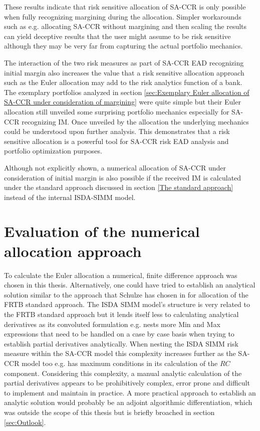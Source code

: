 \documentclass[../Thesis_AHoecherl.tex]{subfiles}
\begin{document}
    These results indicate that risk sensitive allocation of SA-CCR is only possible when fully recognizing margining during the allocation. Simpler workarounds such as e.g. allocating SA-CCR without margining and then scaling the results can yield deceptive results that the user might assume to be risk sensitive although they may be very far from capturing the actual portfolio mechanics.
    
    The interaction of the two risk measures as part of SA-CCR EAD recognizing initial margin also increases the value that a risk sensitive allocation approach such as the Euler allocation may add to the risk analytics function of a bank.
    The exemplary portfolios analyzed in section \ref{sec:Exemplary Euler allocation of SA-CCR under consideration of margining} were quite simple but their Euler allocation still unveiled some surprising portfolio mechanics especially for SA-CCR recognizing IM.
    Once unveiled by the allocation the underlying mechanics could be understood upon further analysis. This demonstrates that a risk sensitive allocation is a powerful tool for SA-CCR risk EAD analysis and portfolio optimization purposes.

    Although not explicitly shown, a numerical allocation of SA-CCR under consideration of initial margin is also possible if the received IM is calculated under the standard approach discussed in section \ref{The standard approach} instead of the internal ISDA-SIMM model. 

    \section{Evaluation of the numerical allocation approach\label{Evaluation of the numerical allocation approach}}

    To calculate the Euler allocation a numerical, finite difference approach was chosen in this thesis. Alternatively, one could have tried to establish an analytical solution similar to the approach that Schulze has chosen in \cite{schulze2018capital} for allocation of the FRTB standard approach.
    The ISDA SIMM model's structure is very related to the FRTB standard approach but it lends itself less to calculating analytical derivatives as its convoluted formulation e.g. nests more Min and Max expressions that need to be handled on a case by case basis when trying to establish partial derivatives analytically.
    When nesting the ISDA SIMM risk measure within the SA-CCR model this complexity increases further as the SA-CCR model too e.g. has maximum conditions in its calculation of the $RC$ component.
    Considering this complexity, a manual analytic calculation of the partial derivatives appears to be prohibitively complex, error prone and difficult to implement and maintain in practice.
    A more practical approach to establish an analytic solution would probably be an adjoint algorithmic differentiation, which was outside the scope of this thesis but is briefly broached in section \ref{sec:Outlook}.
\end{document}
